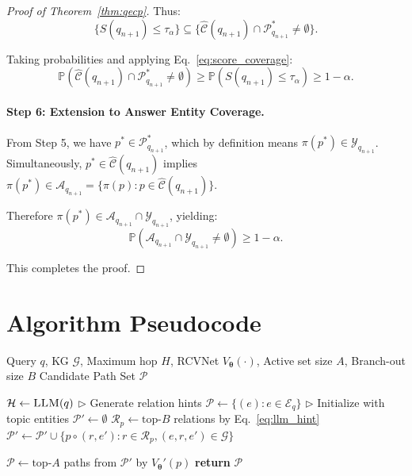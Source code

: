 \documentclass{article}
\theoremstyle{plain}
\theoremstyle{definition}
\theoremstyle{remark}
\begin{document}
\begin{proof}[Proof of Theorem~\ref{thm:qecp}]
Thus:
\[
\{S(q_{n+1}) \le \tau_\alpha\} \subseteq \{\hat{\mathcal{C}}(q_{n+1}) \cap \mathcal{P}^*_{q_{n+1}} \neq \emptyset\}.
\]

Taking probabilities and applying Eq.~\eqref{eq:score_coverage}:
\[
\mathbb{P}(\hat{\mathcal{C}}(q_{n+1}) \cap \mathcal{P}^*_{q_{n+1}} \neq \emptyset) \ge \mathbb{P}(S(q_{n+1}) \le \tau_\alpha) \ge 1-\alpha.
\]

\paragraph{Step 6: Extension to Answer Entity Coverage.}
From Step 5, we have $p^* \in \mathcal{P}^*_{q_{n+1}}$, which by definition means $\pi(p^*) \in \mathcal{Y}_{q_{n+1}}$. Simultaneously, $p^* \in \hat{\mathcal{C}}(q_{n+1})$ implies $\pi(p^*) \in \mathcal{A}_{q_{n+1}} = \{\pi(p) : p \in \hat{\mathcal{C}}(q_{n+1})\}$.

Therefore $\pi(p^*) \in \mathcal{A}_{q_{n+1}} \cap \mathcal{Y}_{q_{n+1}}$, yielding:
\[
\mathbb{P}(\mathcal{A}_{q_{n+1}} \cap \mathcal{Y}_{q_{n+1}} \neq \emptyset) \ge 1-\alpha.
\]

This completes the proof.
\end{proof}

\section{Algorithm Pseudocode}
\label{app:algorithm}


\begin{algorithm}[h]
\caption{TreeG Retrieval}
\label{alg:treeg}
\begin{algorithmic}[1]
\renewcommand{\algorithmicrequire}{\textbf{Input:}} 
\renewcommand{\algorithmicensure}{\textbf{Output:}} 
\REQUIRE Query $q$, KG $\mathcal{G}$, Maximum hop $H$, RCVNet $V_{\bm\theta}(\cdot)$, Active set size $A$, Branch-out size $B$
\ENSURE Candidate Path Set $\mathcal{P}$

\STATE $\mathcal{H} \gets \textsc{LLM}(q)$ \hfill $\triangleright$ Generate relation hints
\STATE $\mathcal{P} \gets \{(e) : e \in \mathcal{E}_q\}$ \hfill $\triangleright$ Initialize with topic entities
    \STATE $\mathcal{P}' \gets \emptyset$
        \STATE $\mathcal{R}_p \gets \text{top-}B$ relations by Eq.~\ref{eq:llm_hint}
        \STATE $\mathcal{P}' \gets \mathcal{P}' \cup \{p \circ (r, e') : r \in \mathcal{R}_p, (e, r, e') \in \mathcal{G}\}$

    \ENDFOR
    \STATE $\mathcal{P} \gets \text{top-}A$ paths from $\mathcal{P}'$ by $V_{\bm\theta}'(p)$ \hfill 
\ENDFOR
\STATE \textbf{return } $\mathcal{P}$

\end{algorithmic}
\end{algorithm}
\end{document}
